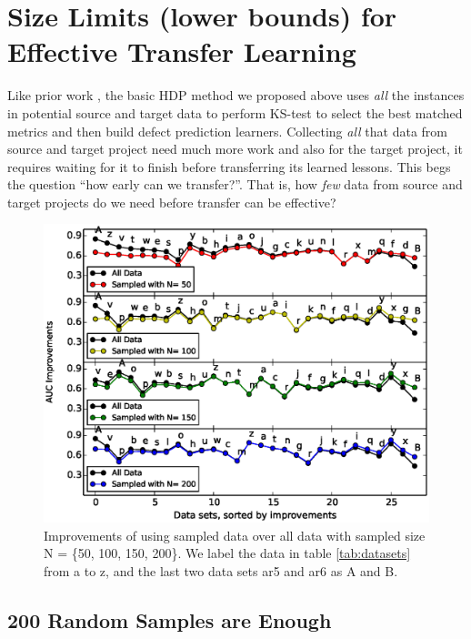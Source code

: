 
\section{Size Limits (lower bounds) for Effective Transfer Learning}
\label{sec:sizelimit}

Like prior work \cite{nam2013transfer,
  ma2012transfer, rahman2012recalling, ryu2014value,
  zhang2014towards}, the basic HDP method we
proposed above uses {\em all} the instances in potential source and target data to
perform KS-test to select the best matched metrics and then build
defect prediction learners.
Collecting {\em all} that data from source and target project need much more work and also
for the target project, it requires waiting for it to finish before
transferring its learned lessons. This begs the question ``how early can we transfer?''.
That is, how {\em few} data from source and target projects do we need before transfer can be effective?

\begin{figure}[t]
	\centering
	\includegraphics[width=\linewidth]{Figures/raleigh/sample_random.eps}
	\caption{Improvements of using sampled data over all data with sampled size N = \{50, 100, 150, 200\}. We label the data in table \ref{tab:datasets} from a to z, and the last two data sets ar5 and ar6 as A and B.}
	\label{fig:small_data}
\end{figure}


\subsection{200 Random Samples are Enough}

